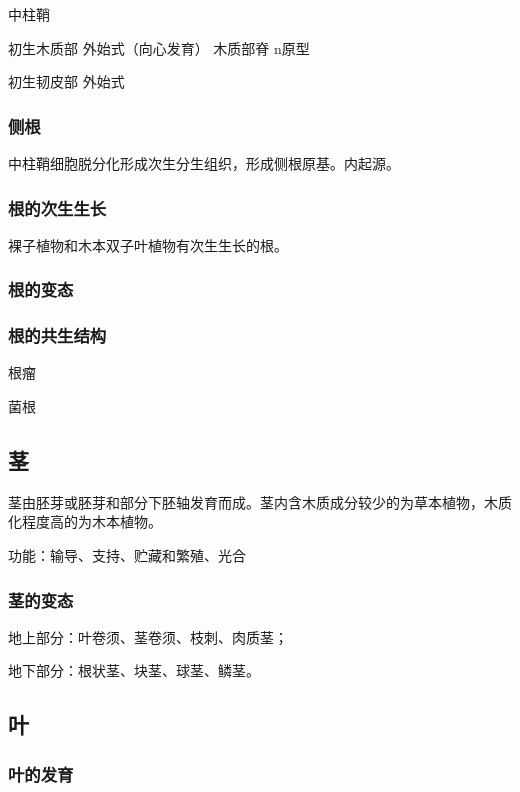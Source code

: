 	中柱鞘
	
	初生木质部 外始式（向心发育） 木质部脊 n原型
	
	初生韧皮部 外始式 
	
	\subsubsection{侧根}
	
	中柱鞘细胞脱分化形成次生分生组织，形成侧根原基。内起源。
	
	\subsubsection{根的次生生长}
	
	裸子植物和木本双子叶植物有次生生长的根。
	
	\subsubsection{根的变态}
	
	\subsubsection{根的共生结构}
	
	根瘤
	
	菌根
	
	\subsection{茎}
	
	茎由胚芽或胚芽和部分下胚轴发育而成。茎内含木质成分较少的为草本植物，木质化程度高的为木本植物。
	
	功能：输导、支持、贮藏和繁殖、光合
	
	\subsubsection{茎的变态}
	
	地上部分：叶卷须、茎卷须、枝刺、肉质茎；
	
	地下部分：根状茎、块茎、球茎、鳞茎。
	
	
	\subsection{叶}
	
	\subsubsection{叶的发育}
	
